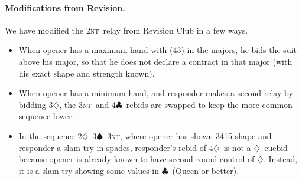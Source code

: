 \documentclass{report}
\renewcommand{\c}{\ensuremath{\clubsuit}}
\renewcommand{\d}{\ensuremath{\diamondsuit}}
\newcommand{\s}{\ensuremath{\spadesuit}}
\newcommand{\nt}{\textsc{nt}}
\newcommand{\+}{\ensuremath{^+}}
\newcommand{\modifications}{\paragraph{Modifications from Revision.}}
\begin{document}
\modifications We have modified the 2\nt\ relay from Revision Club in a few ways.
\begin{itemize}
\item When opener has a maximum hand with (43) in the majors, he bids
  the suit above his major, so that he does not declare a contract in
  that major (with his exact shape and strength known).
\item When opener has a minimum hand, and responder makes a second
  relay by bidding 3\d, the 3\nt\ and 4\c\ rebids are swapped to keep
  the more common sequence lower.
\item In the sequence 2\d--3\s--3\nt, where opener has shown 3415
  shape and responder a slam try in spades, responder's rebid of
  4\d\ is not a \d\ cuebid because opener is already known to have
  second round control of \d.  Instead, it is a slam try showing some
  values in \c\ (Queen or better).
\end{itemize}
\end{document}
